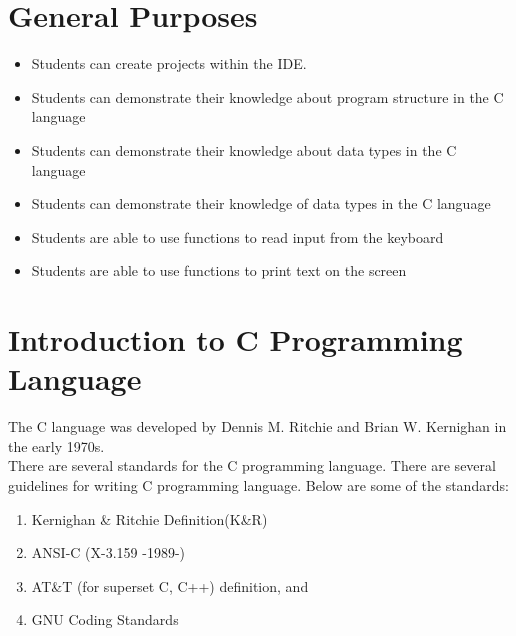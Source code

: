 \section{General Purposes}
\begin{itemize}[label=$\bullet$, itemsep=-1pt, leftmargin=*]
	\item Students can create projects within the IDE.
	\item Students can demonstrate their knowledge about program structure in the C language
	\item Students can demonstrate their knowledge about data types in the C language
	\item Students can demonstrate their knowledge of data types in the C language
    \item Students are able to use functions to read input from the keyboard
    \item Students are able to use functions to print text on the screen

\end{itemize}
\section{Introduction to C Programming Language}

The C language was developed by Dennis M. Ritchie and Brian W. Kernighan in the early 1970s.\\
There are several standards for the C programming language. There are several guidelines for writing C programming language. Below are some of the standards:
\begin{enumerate}
	\item Kernighan \& Ritchie Definition(K\&R)
    \item ANSI-C (X-3.159 -1989-)
    \item AT\&T (for superset C, C++) definition, and
    \item GNU Coding Standards
\end{enumerate}
